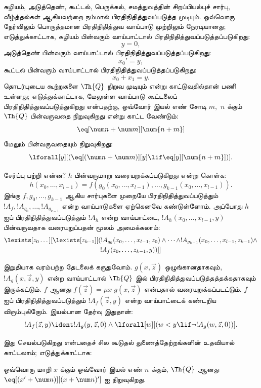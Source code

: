 \documentclass[../../../include/open-logic-section]{subfiles}
\begin{document}
சுழியம், அடுத்தெண், கூட்டல், பெருக்கல், சமத்துவத்தின் சிறப்பியல்புச்
சார்பு, வீழ்த்தல்கள் ஆகியவற்றை நம்மால் பிரதிநிதித்துவப்படுத்த முடியும்.
ஒவ்வொரு நேர்விலும் பொருத்தமான பிரதிநிதித்துவ வாய்பாடு முற்றிலும்
நேரடியானது; எடுத்துக்காட்டாக, சுழியம் பின்வரும் வாய்பாட்டால்
பிரதிநிதித்துவப்படுத்தப்படுகிறது:
\[
y = 0,
\]
அடுத்தெண் பின்வரும் வாய்பாட்டால் பிரதிநிதித்துவப்படுத்தப்படுகிறது:
\[
x_0' = y,
\]
கூட்டல் பின்வரும் வாய்பாட்டால் பிரதிநிதித்துவப்படுத்தப்படுகிறது:
\[
x_0 + x_1 = y.
\]
தொடர்புடைய கூற்றுகளை $\Th{Q}$ நிறுவ முடியும் என்று காட்டுவதில்தான்
பணி உள்ளது; எடுத்துக்காட்டாக, மேலுள்ள வாய்பாடு கூட்டலைப்
பிரதிநிதித்துவப்படுத்துகிறது என்பதற்கு, ஒவ்வோர் இயல் எண் சோடி
$m$,~$n$ க்கும் $\Th{Q}$ பின்வருவதை நிறுவுகிறது என்று காட்ட வேண்டும்:
\[
\eq[\num n + \num m][\num {n+m}]
\]
மேலும் பின்வருவதையும் நிறுவுகிறது:
\[
\lforall[y][(\eq[(\num n + \num m)][y] \lif \eq[y][\num {n+m}])].
\]

சேர்ப்பு பற்றி என்ன? $h$ பின்வருமாறு வரையறுக்கப்படுகிறது என்று கொள்க:
\[
h(x_0,\dots,x_{l-1}) = f(g_0(x_0,\dots,x_{l-1}), \dots,
g_{k-1}(x_0,\dots,x_{l-1})).
\]
இங்கு $f,g_0,\dots,g_{k-1}$ ஆகிய சார்புகளை முறையே
பிரதிநிதித்துவப்படுத்தும் $!A_f, !A_{g_0}, \dots,
!A_{g_{k-1}}$ என்ற வாய்பாடுகளை ஏற்கெனவே கண்டுள்ளோம். அப்போது
$h$ ஐப் பிரதிநிதித்துவப்படுத்தும் $!A_h$ என்ற வாய்பாட்டை,
$!A_h(x_0,\dots,x_{l-1},y)$ பின்வருவதாக வரையறுப்பதன் மூலம்
அமைக்கலாம்:
\begin{multline*}
  \lexists[z_0\dots][\lexists[z_{k-1}][(!A_{g_0}(x_0,\dots,x_{l-1},z_0) \land
  \dots \land !A_{g_{k-1}}(x_0,\dots,x_{l-1},z_{k-1}) \land\\
  !A_f(z_0,\dots,z_{k-1},y))]]
\end{multline*}

இறுதியாக வரம்பற்ற தேடலைக் கருதுவோம். $g(x,\vec z)$ ஒழுங்கானதாகவும்,
$!A_g(x,\vec z,y)$ என்ற வாய்பாட்டால் $\Th{Q}$ இல்
பிரதிநிதித்துவப்படுத்தத்தக்கதாகவும் இருக்கட்டும். $f$ ஆனது
$f(\vec z) = \mu x \; g(x,\vec z)$ என்பதால் வரையறுக்கப்படட்டும்.
$f$ ஐப் பிரதிநிதித்துவப்படுத்தும் $!A_f(\vec z,y)$ என்ற
வாய்பாட்டைக் கண்டறிய விரும்புகிறோம். இயல்பான தேர்வு இதுதான்:
\[
!A_f(\vec z,y) \ident !A_g(y,\vec z,0) \land \lforall[w][(w < y
\lif \lnot !A_g(w,\vec z,0))].
\]

இது செயல்படுகிறது என்பதைச் சில கூடுதல் துணைத்தேற்றங்களின் உதவியால்
காட்டலாம்; எடுத்துக்காட்டாக:

\begin{lem}
  ஒவ்வொரு மாறி $x$ க்கும் ஒவ்வோர் இயல் எண் $n$ க்கும்,
  $\Th{Q}$ ஆனது $\eq[(x'
  + \num n)][(x + \num n)']$ ஐ நிறுவுகிறது.
\end{lem}
\end{document}
